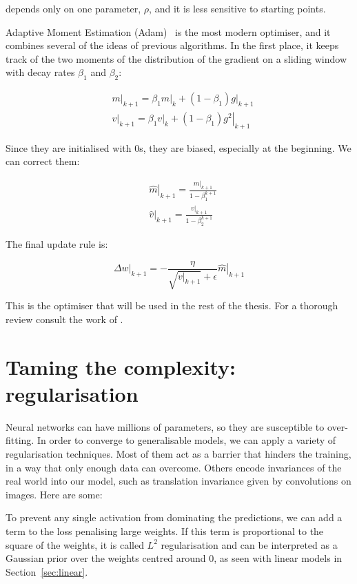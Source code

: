 \ADADELTA{} depends only on one parameter, $\rho$, and it is less sensitive to starting points.

Adaptive Moment Estimation (Adam)~\citep{adam}
is the most modern optimiser, and it combines several of the ideas of previous algorithms.
In the first place, it keeps track of the two moments of the distribution of the gradient on a sliding window with decay rates $\beta_1$ and $\beta_2$:

\begin{align*}
&\left.m\right|_{k+1} = \beta_1 \left.m\right|_k + (1-\beta_1) \left.g\right|_{k+1}\\
&\left.v\right|_{k+1} = \beta_1 \left.v\right|_k + (1-\beta_1) \left.g^2\right|_{k+1}
\end{align*}

Since they are initialised with 0s, they are biased, especially at the beginning. We can correct them:

\begin{align*}
	&\left.\hat{m}\right|_{k+1} = \frac{\left.m\right|_{k+1}}{1-\beta_1^{k+1}}\\
	&\left.\hat{v}\right|_{k+1} = \frac{\left.v\right|_{k+1}}{1-\beta_2^{k+1}}
\end{align*}

The final update rule is:

\begin{equation*}
\left.\Delta w\right|_{k+1} = - \frac{\eta}{\sqrt{\left.v\right|_{k+1}} + \epsilon}\left.\hat{m}\right|_{k+1}
\end{equation*} 

This is the optimiser that will be used in the rest of the thesis.
For a thorough review consult the work of \citet{optimisers_review}.


\section{Taming the complexity: regularisation}
Neural networks can have millions of parameters, so they are susceptible to over-fitting.
In order to converge to generalisable models, we can apply a variety of regularisation techniques.
Most of them act as a barrier that hinders the training, in a way that only enough data can overcome.
Others encode invariances of the real world into our model, such as translation invariance given by convolutions on images.
Here are some:


To prevent any single activation from 
dominating the predictions, we can add a term to the loss penalising large weights.
If this term is proportional to the square of the weights, it is called $L^2$ regularisation and can be interpreted as a Gaussian prior over the weights centred around $0$, as seen with linear models in Section~\ref{sec:linear}.

